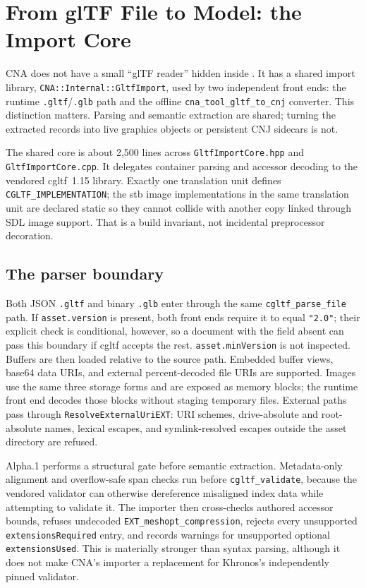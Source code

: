 \chapter{From glTF File to Model: the Import Core}
\label{ch:gltf-import-core}

CNA does not have a small ``glTF reader'' hidden inside . It has a
shared import library, \texttt{CNA::Internal::GltfImport}, used by two independent front ends:
the runtime \texttt{.gltf}/\texttt{.glb} path and the offline
\texttt{cna\_tool\_gltf\_to\_cnj} converter. This distinction matters. Parsing and semantic
extraction are shared; turning the extracted records into live graphics objects or persistent
CNJ sidecars is not.

The shared core is about 2,500 lines across \texttt{GltfImportCore.hpp} and
\texttt{GltfImportCore.cpp}. It delegates container parsing and accessor decoding to the
vendored cgltf~1.15 library. Exactly one translation unit defines
\texttt{CGLTF\_IMPLEMENTATION}; the stb image implementations in the same translation unit
are declared static so they cannot collide with another copy linked through SDL image support.
That is a build invariant, not incidental preprocessor decoration.



\section{The parser boundary}

Both JSON \texttt{.gltf} and binary \texttt{.glb} enter through the same
\texttt{cgltf\_parse\_file} path. If \texttt{asset.version} is present, both front ends require
it to equal \texttt{"2.0"}; their explicit check is conditional, however, so a document with the
field absent can pass this boundary if cgltf accepts the rest. \texttt{asset.minVersion} is not
inspected. Buffers are then loaded relative to the source path. Embedded buffer views, base64 data
URIs, and external percent-decoded file URIs are supported. Images use the same three storage forms
and are exposed as memory blocks; the runtime front end decodes those blocks without staging
temporary files. External paths pass through \texttt{ResolveExternalUriEXT}: URI schemes,
drive-absolute and root-absolute names, lexical escapes, and symlink-resolved escapes outside the
asset directory are refused.

Alpha.1 performs a structural gate before semantic extraction. Metadata-only alignment and
overflow-safe span checks run before \texttt{cgltf\_validate}, because the vendored validator can
otherwise dereference misaligned index data while attempting to validate it. The importer then
cross-checks authored accessor bounds, refuses undecoded \texttt{EXT\_meshopt\_compression},
rejects every unsupported \texttt{extensionsRequired} entry, and records warnings for unsupported
optional \texttt{extensionsUsed}. This is materially stronger than syntax parsing, although it
does not make CNA's importer a replacement for Khronos's independently pinned validator.

